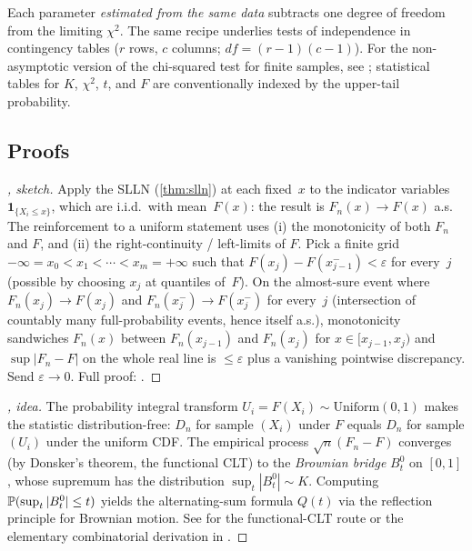 \begin{remark}
Each parameter \emph{estimated from the same data} subtracts one
degree of freedom from the limiting $\chi^2$. The same recipe
underlies tests of independence in contingency tables ($r$ rows,
$c$ columns; $df = (r - 1)(c - 1)$). For the non-asymptotic version
of the chi-squared test for finite samples, see
\cite[Ch.~VIII]{Sevastyanov1982}; statistical tables for $K$,
$\chi^2$, $t$, and $F$ are conventionally indexed by the upper-tail
probability.
\end{remark}

\subsection*{Proofs}

\begin{proof}[, sketch]
Apply the SLLN (\cref{thm:slln}) at each fixed~$x$ to the indicator
variables $\mathbf{1}_{\{X_i \leq x\}}$, which are i.i.d.\ with
mean~$F(x)$: the result is $F_n(x) \to F(x)$ a.s. The reinforcement
to a uniform statement uses (i) the monotonicity of both $F_n$
and $F$, and (ii) the right-continuity / left-limits of $F$. Pick a
finite grid
$-\infty = x_0 < x_1 < \cdots < x_m = +\infty$ such that
$F(x_j) - F(x_{j-1}^{-}) < \varepsilon$ for every~$j$ (possible by
choosing $x_j$ at quantiles of~$F$). On the almost-sure event where
$F_n(x_j) \to F(x_j)$ and $F_n(x_j^-) \to F(x_j^-)$ for every~$j$
(intersection of countably many full-probability events, hence
itself a.s.), monotonicity sandwiches $F_n(x)$ between
$F_n(x_{j-1})$ and $F_n(x_j)$ for $x \in [x_{j-1}, x_j)$ and
$\sup |F_n - F|$ on the whole real line is $\leq \varepsilon$
plus a vanishing pointwise discrepancy. Send $\varepsilon \to 0$.
Full proof: \cite[Ch.~II, \S~10]{Shiryaev1989}.
\end{proof}

\begin{proof}[, idea]
The probability integral transform $U_i = F(X_i) \sim \mathrm{Uniform}(0, 1)$
makes the statistic distribution-free: $D_n$ for sample $(X_i)$
under $F$ equals $D_n$ for sample $(U_i)$ under the uniform CDF.
The empirical process $\sqrt n (F_n - F)$ converges (by Donsker's
theorem, the functional CLT) to the \emph{Brownian bridge}
$B^0_t$ on $[0, 1]$, whose supremum has the distribution
$\sup_t |B^0_t| \sim K$. Computing
$\mathbb{P}(\sup_t |B^0_t| \leq t)$ yields the alternating-sum formula
$Q(t)$ via the reflection principle for Brownian motion. See
\cite[Ch.~XII]{Shiryaev1989} for the functional-CLT route or the
elementary combinatorial derivation in
\cite[Ch.~IX]{Sevastyanov1982}.
\end{proof}

